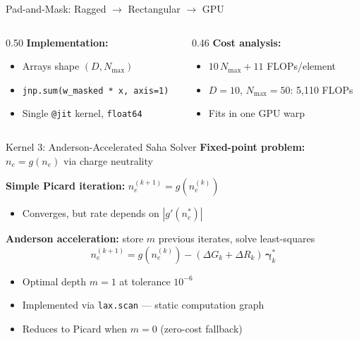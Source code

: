 \documentclass[aspectratio=169,10pt]{beamer}
\begin{document}
\begin{frame}{Pad-and-Mask: Ragged $\to$ Rectangular $\to$ GPU}
	\begin{columns}[T]
		\begin{column}{0.50\textwidth}
			{\small\textbf{Implementation:}}
			\begin{itemize}
				\item {\small Arrays shape $(D, N_\text{max})$}
				\item {\small \texttt{jnp.sum(w\_masked * x, axis=1)}}
				\item {\small Single \texttt{@jit} kernel, \texttt{float64}}
			\end{itemize}
		\end{column}
		\begin{column}{0.46\textwidth}
			{\small\textbf{Cost analysis:}}
			\begin{itemize}
				\item {\small $10\, N_\text{max} + 11$ FLOPs/element}
				\item {\small $D\!=\!10$, $N_\text{max}\!=\!50$: \alert{5{,}110 FLOPs}}
				\item {\small Fits in one GPU warp}
			\end{itemize}
		\end{column}
	\end{columns}
\end{frame}

\begin{frame}{Kernel 3: Anderson-Accelerated Saha Solver}
	\textbf{Fixed-point problem:} $n_e = g(n_e)$ via charge neutrality

	\vspace{0.5em}
	\textbf{Simple Picard iteration:} $n_e^{(k+1)} = g(n_e^{(k)})$
	\begin{itemize}
		\item Converges, but rate depends on $|g'(n_e^*)|$
	\end{itemize}

	\vspace{0.3em}
	\textbf{Anderson acceleration:} store $m$ previous iterates, solve least-squares
	\begin{equation*}
		n_e^{(k+1)} = g(n_e^{(k)}) - (\Delta G_k + \Delta R_k)\, \bm{\gamma}_k^*
	\end{equation*}

	\begin{itemize}
		\item Optimal depth $m = 1$ at tolerance $10^{-6}$
		\item Implemented via \texttt{lax.scan} --- static computation graph
		\item Reduces to Picard when $m = 0$ (zero-cost fallback)
	\end{itemize}
\end{frame}
\end{document}
